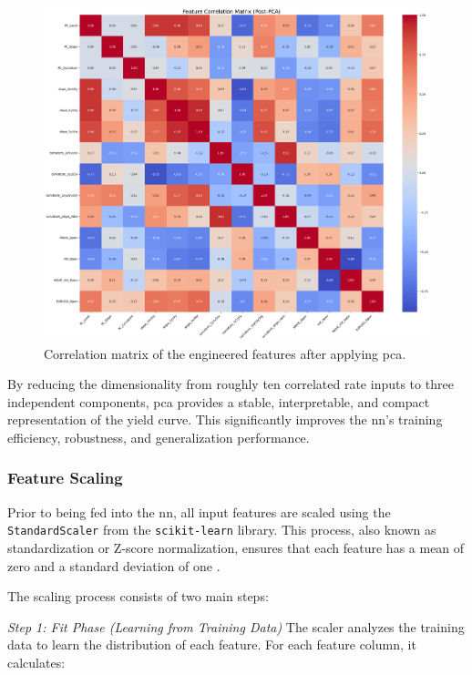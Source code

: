 \begin{figure}[H]
	\centering
	\includegraphics[width=1\textwidth]{images/features/feature_correlation_matrixPost-PCA.png}
	\caption{Correlation matrix of the engineered features after applying \ac{pca}.}
	\label{fig:feature_correlation_postPCA}
\end{figure}

By reducing the dimensionality from roughly ten correlated rate inputs to three independent components, \ac{pca} provides a stable, interpretable, and compact representation of the yield curve. This significantly improves the \ac{nn}'s training efficiency, robustness, and generalization performance.

\subsubsection{Feature Scaling}
Prior to being fed into the \ac{nn}, all input features are scaled using the \texttt{StandardScaler} from the \texttt{scikit-learn} library. This process, also known as standardization or Z-score normalization, ensures that each feature has a mean of zero and a standard deviation of one \parencite[pp.~31--32]{zheng2018feature}.

The scaling process consists of two main steps:

\textit{Step 1: Fit Phase (Learning from Training Data)}
The scaler analyzes the training data to learn the distribution of each feature. For each feature column, it calculates:

